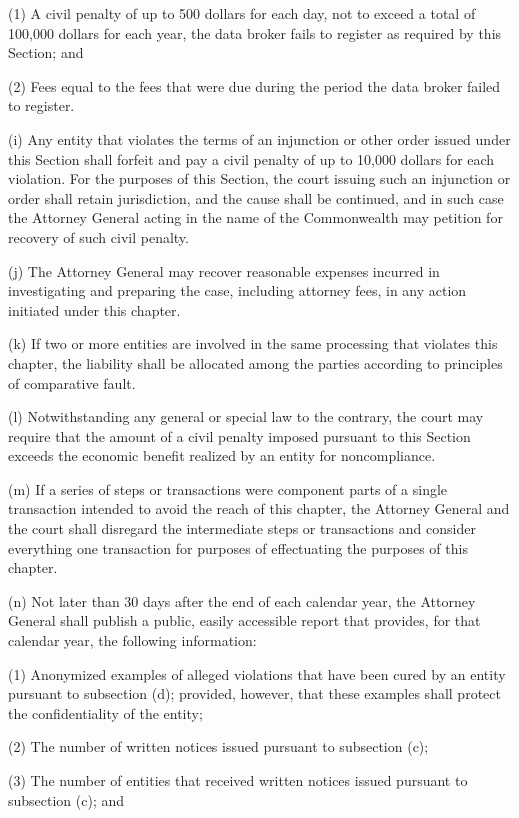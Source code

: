 (1) A civil penalty of up to 500 dollars for each day, not to exceed a total of 100,000 dollars for each year, the data broker fails to register as required by this Section; and

(2) Fees equal to the fees that were due during the period the data broker failed to register.

(i) Any entity that violates the terms of an injunction or other order issued under this Section shall forfeit and pay a civil penalty of up to 10,000 dollars for each violation. For the purposes of this Section, the court issuing such an injunction or order shall retain jurisdiction, and the cause shall be continued, and in such case the Attorney General acting in the name of the Commonwealth may petition for recovery of such civil penalty.

(j) The Attorney General may recover reasonable expenses incurred in investigating and preparing the case, including attorney fees, in any action initiated under this chapter.

(k) If two or more entities are involved in the same processing that violates this chapter, the liability shall be allocated among the parties according to principles of comparative fault. 

(l) Notwithstanding any general or special law to the contrary, the court may require that the amount of a civil penalty imposed pursuant to this Section exceeds the economic benefit realized by an entity for noncompliance.

(m) If a series of steps or transactions were component parts of a single transaction intended to avoid the reach of this chapter, the Attorney General and the court shall disregard the intermediate steps or transactions and consider everything one transaction for purposes of effectuating the purposes of this chapter. 

(n) Not later than 30 days after the end of each calendar year, the Attorney General shall publish a public, easily accessible report that provides, for that calendar year, the following information:

(1) Anonymized examples of alleged violations that have been cured by an entity pursuant to subsection (d); provided, however, that these examples shall protect the confidentiality of the entity;

(2) The number of written notices issued pursuant to subsection (c);

(3) The number of entities that received written notices issued pursuant to subsection (c); and

